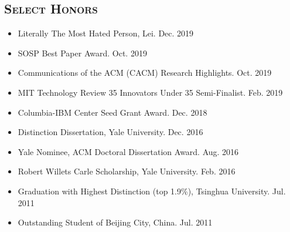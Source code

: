 \documentclass[10pt]{article}
\renewcommand{\section}[1]{
	\vspace{-5pt}
   	\subsection*{\scshape  \bfseries #1}
   }
\newenvironment{innerlist}[1][\enskip\textbullet]%
        {\begin{itemize}[#1,leftmargin=25pt,parsep=0pt,itemsep=2pt,topsep=2pt,partopsep=0pt]}
        {\end{itemize}}
\begin{document}
\section{Select Honors}
\begin{innerlist}

\item[] 
Literally The Most Hated Person, Lei.
\hfill{Dec. 2019}

 \vspace{0.05in}


\item[] 
SOSP Best Paper Award.
\hfill{Oct. 2019}

 \vspace{0.05in}

\item[] 
Communications of the ACM (CACM) Research Highlights.
\hfill{Oct. 2019}

 \vspace{0.05in}

\item[] MIT Technology Review 35 Innovators Under 35 Semi-Finalist.  
\hfill{Feb. 2019}

\vspace{0.05in}

\item[] Columbia-IBM Center Seed Grant Award. \hfill{Dec. 2018}%
\vspace{0.05in}

\item[] Distinction Dissertation, Yale University. \hfill{Dec. 2016}

\vspace{0.05in}

\item[] Yale Nominee, ACM Doctoral Dissertation Award. \hfill{Aug. 2016}

\vspace{0.05in}

\item[] Robert Willets Carle Scholarship, Yale University. \hfill Feb. 2016

\vspace{0.05in}

\item[] Graduation with Highest Distinction (top 1.9\%), Tsinghua University. \hfill Jul. 2011

\vspace{0.05in}

\item[] Outstanding Student of Beijing City, China. \hfill Jul. 2011


\end{innerlist}
\end{document}

